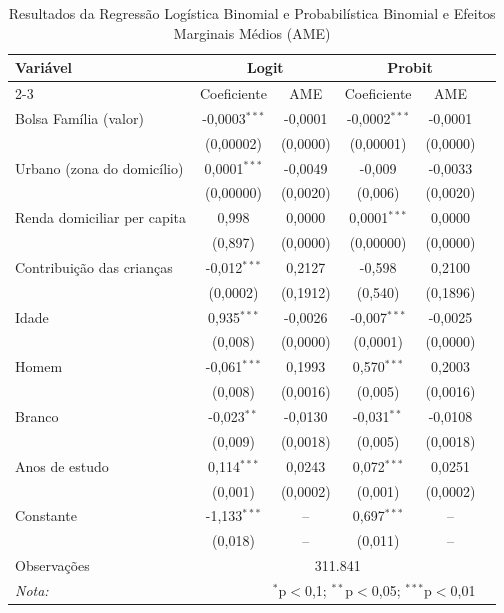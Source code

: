 \documentclass[12pt]{article}
\theoremstyle{break}
\begin{document}
\begin{table}[H] 
\centering 
\renewcommand{\arraystretch}{1.5} 
  \caption{Resultados da Regressão Logística Binomial e Probabilística Binomial e Efeitos Marginais Médios (AME)} 
  \label{tab:logit_probit} 
\begin{tabular}{lccccc} 
\hline 
\hline 
Variável & \multicolumn{2}{c}{\textbf{Logit}} & \multicolumn{2}{c}{\textbf{Probit}} \\ 
\cline{2-3} \cline{4-5} 
         & Coeficiente & AME & Coeficiente & AME \\ 
\hline 
Bolsa Família (valor) & -0,0003$^{***}$ & -0,0001 & -0,0002$^{***}$ & -0,0001 \\ 
                       & (0,00002) & (0,0000) & (0,00001) & (0,0000) \\ 
Urbano (zona do domicílio) & 0,0001$^{***}$ & -0,0049 & -0,009 & -0,0033 \\ 
                       & (0,00000) & (0,0020) & (0,006) & (0,0020) \\ 
Renda domiciliar per capita & 0,998 & 0,0000 & 0,0001$^{***}$ & 0,0000 \\ 
                            & (0,897) & (0,0000) & (0,00000) & (0,0000) \\ 
Contribuição das crianças & -0,012$^{***}$ & 0,2127 & -0,598 & 0,2100 \\ 
                           & (0,0002) & (0,1912) & (0,540) & (0,1896) \\ 
Idade & 0,935$^{***}$ & -0,0026 & -0,007$^{***}$ & -0,0025 \\ 
      & (0,008) & (0,0000) & (0,0001) & (0,0000) \\ 
Homem & -0,061$^{***}$ & 0,1993 & 0,570$^{***}$ & 0,2003 \\ 
      & (0,008) & (0,0016) & (0,005) & (0,0016) \\ 
Branco & -0,023$^{**}$ & -0,0130 & -0,031$^{**}$ & -0,0108 \\ 
       & (0,009) & (0,0018) & (0,005) & (0,0018) \\ 
Anos de estudo & 0,114$^{***}$ & 0,0243 & 0,072$^{***}$ & 0,0251 \\ 
               & (0,001) & (0,0002) & (0,001) & (0,0002) \\ 
Constante & -1,133$^{***}$ & -- & 0,697$^{***}$ & -- \\ 
          & (0,018) & -- & (0,011) & -- \\ 
\hline 
Observações & \multicolumn{4}{c}{311.841} \\ 
\hline 
\hline 
\textit{Nota:} & \multicolumn{4}{r}{$^{*}$p$<$0,1; $^{**}$p$<$0,05; $^{***}$p$<$0,01} \\ 
\end{tabular} 
\end{table}
\end{document}
